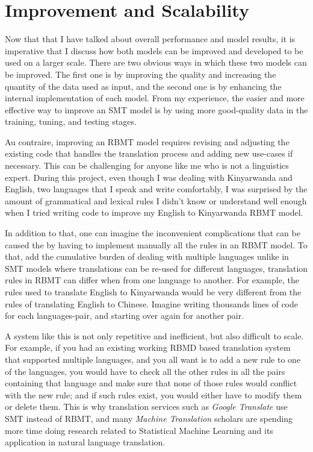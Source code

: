\section{Improvement and Scalability}
Now that that I have talked about overall performance and model results, it is imperative that I discuss how both models can be improved and developed to be used on a larger scale. There are two obvious ways in which these two models can be improved. The first one is by improving the quality and increasing the quantity of the data used as input, and the second one is by enhancing the internal implementation of each model. From my experience, the easier and more effective way to improve an SMT model is by using more good-quality data in the training, tuning, and testing stages. 

Au contraire, improving an RBMT model requires revising and adjusting the existing code that handles the translation process and adding new use-cases if necessary. This can be challenging for anyone like me who is not a linguistics expert. During this project, even though I was dealing with Kinyarwanda and English, two languages that I speak and write comfortably, I was surprised by the amount of grammatical and lexical rules I didn't know or understand well enough when I tried writing code to improve my English to Kinyarwanda RBMT model.


In addition to that, one can imagine the inconvenient complications that can be caused the by having to implement manually all the rules in an RBMT model. To that, add the cumulative burden of dealing with multiple languages unlike in SMT models where translations can be re-used for different languages, translation rules in RBMT can differ when from one language to another\cite{Forcada2011}. For example, the rules used to translate English to Kinyarwanda would be very different from the rules of translating English to Chinese. Imagine writing thousands lines of code for each languages-pair, and starting over again for another pair. 

A system like this is not only repetitive and inefficient, but also difficult to scale. For example, if you had an existing working RBMD based translation system that supported multiple languages, and you all want is to add a new rule to one of the languages, you would have to check all the other rules in all the pairs containing that language and make sure that none of those rules would conflict with the new rule; and if such rules exist, you would either have to modify them or delete them. This is why translation services such as \textit{Google Translate} use SMT instead of RBMT\cite{koehn2003statistical}, and many \textit{Machine Translation} scholars are spending more time doing research related to Statistical Machine Learning and its application in natural language translation\cite{koehn2007moses}. 


